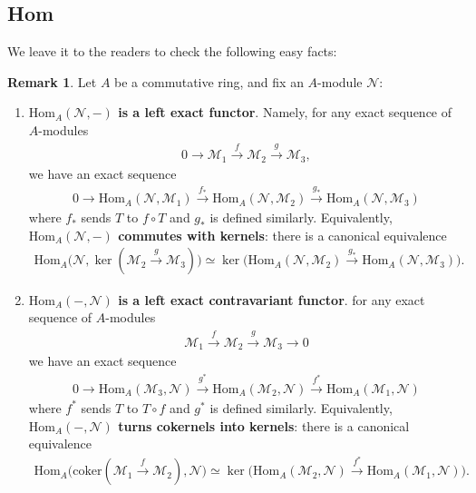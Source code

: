 \documentclass[12pt,b5paper,notitlepage]{report}
\theoremstyle{definition}
\newtheorem{rem}[df]{Remark}
\theoremstyle{plain}
\newcommand{\mc}{\mathcal}
\newcommand{\Hom}{\mathrm{Hom}}
\newcommand{\coker}{\mathrm{coker}}
\numberwithin{equation}{section}
\begin{document}
\subsection{Hom}

We leave it to the readers to check the following easy facts:
\begin{rem}
Let $A$ be a commutative ring, and fix an $A$-module $\mc N$:
\begin{enumerate}[label=\arabic*.]
\item \textbf{$\Hom_A(\mc N,-)$ is a left exact functor}.  Namely, for any exact sequence of $A$-modules
\begin{align}
0\rightarrow\mc M_1\xrightarrow{f} \mc M_2\xrightarrow{g}\mc M_3,
\end{align}
we have an exact sequence 
\begin{align*}
0\rightarrow\Hom_A(\mc N,\mc M_1)\xrightarrow{f_*} \Hom_A(\mc N,\mc M_2)\xrightarrow{g_*}\Hom_A(\mc N,\mc M_3)
\end{align*}
where $f_*$ sends $T$ to $f\circ T$ and $g_*$ is defined similarly. Equivalently, \textbf{$\Hom_A(\mc N,-)$ commutes with kernels}: there is a canonical equivalence
\begin{align}
\Hom_A\big(\mc N,\ker(\mc M_2\xrightarrow{g}\mc M_3)\big)\simeq \ker \big(\Hom_A(\mc N,\mc M_2)\xrightarrow{g_*}\Hom_A(\mc N,\mc M_3)\big).
\end{align}
\item \textbf{$\Hom_A(-,\mc N)$ is a left exact contravariant functor}.  for any exact sequence of $A$-modules
\begin{align}
\mc M_1\xrightarrow{f} \mc M_2\xrightarrow{g}\mc M_3\rightarrow 0
\end{align}
we have an exact sequence 
\begin{align*}
0\rightarrow\Hom_A(\mc M_3,\mc N)\xrightarrow{g^*} \Hom_A(\mc M_2,\mc N)\xrightarrow{f^*}\Hom_A(\mc M_1,\mc N)
\end{align*}
where $f^*$ sends $T$ to $T\circ f$ and $g^*$ is defined similarly. Equivalently, \textbf{$\Hom_A(-,\mc N)$ turns cokernels into kernels}: there is a canonical equivalence
\begin{align}
\Hom_A\big(\coker(\mc M_1\xrightarrow{f}\mc M_2),\mc N\big)\simeq \ker \big(\Hom_A(\mc M_2,\mc N)\xrightarrow{f^*}\Hom_A(\mc M_1,\mc N)\big).
\end{align}
\end{enumerate}
\end{rem}
\end{document}
